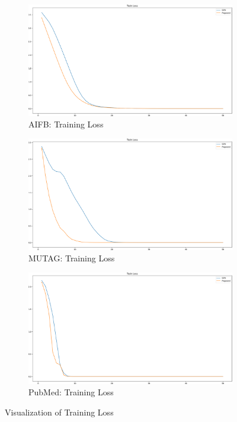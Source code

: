 \documentclass[sigconf]{acmart}
\begin{document}
\begin{figure}[!ht]
    \centering
    \begin{subfigure}{0.45\textwidth}
        \includegraphics[width=\textwidth]{./figs/aifb-loss-2.png}
        \caption{AIFB: Training Loss}
    \end{subfigure}
    \begin{subfigure}{0.45\textwidth}
        \includegraphics[width=\textwidth]{./figs/mutag-loss-2.png}
        \caption{MUTAG: Training Loss}
    \end{subfigure}
    \begin{subfigure}{0.45\textwidth}
        \includegraphics[width=\textwidth]{./figs/pubmed-loss-2.png}
        \caption{PubMed: Training Loss}
    \end{subfigure}
    \caption{Visualization of Training Loss}
    \label{fig:loss}
\end{figure}
\end{document}
